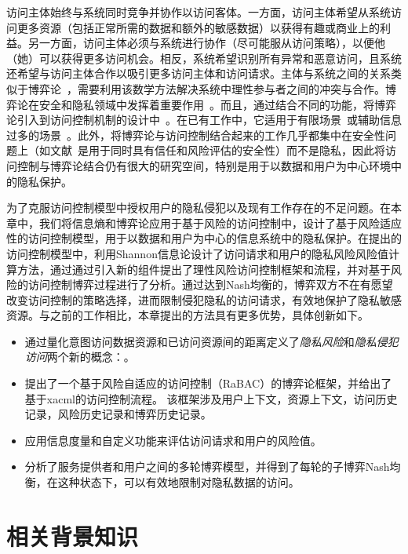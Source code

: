 访问主体始终与系统同时竞争并协作以访问客体。一方面，访问主体希望从系统访问更多资源（包括正常所需的数据和额外的敏感数据）以获得有趣或商业上的利益。另一方面，访问主体必须与系统进行协作（尽可能服从访问策略），以便他（她）可以获得更多访问机会。相反，系统希望识别所有异常和恶意访问，且系统还希望与访问主体合作以吸引更多访问主体和访问请求。主体与系统之间的关系类似于博弈论~\cite{gibbons1992game}，需要利用该数学方法解决系统中理性参与者之间的冲突与合作。博弈论在安全和隐私领域中发挥着重要作用~\cite{do2017game,zhu2018game}。而且，通过结合不同的功能，将博弈论引入到访问控制机制的设计中~\cite{hu2014game,zhang2015towards,liu2016dynamic,gao2018game, helil2017non}。在已有工作中，它适用于有限场景~\cite{hu2014game,gao2018game}或辅助信息过多的场景~\cite{zhang2015towards,liu2016dynamic,helil2017non}。此外，将博弈论与访问控制结合起来的工作几乎都集中在安全性问题上（如文献~\cite{helil2017non}是用于同时具有信任和风险评估的安全性）而不是隐私，因此将访问控制与博弈论结合仍有很大的研究空间，特别是用于以数据和用户为中心环境中的隐私保护。

为了克服访问控制模型中授权用户的隐私侵犯以及现有工作存在的不足问题。在本章中，我们将信息熵和博弈论应用于基于风险的访问控制中，设计了基于风险适应性的访问控制模型，用于以数据和用户为中心的信息系统中的隐私保护。在提出的访问控制模型中，利用Shannon信息论设计了访问请求和用户的隐私风险风险值计算方法，通过通过引入新的组件提出了理性风险访问控制框架和流程，并对基于风险的访问控制博弈过程进行了分析。通过达到Nash均衡的，博弈双方不在有愿望改变访问控制的策略选择，进而限制侵犯隐私的访问请求，有效地保护了隐私敏感资源。与之前的工作相比，本章提出的方法具有更多优势，具体创新如下。

\begin{itemize}
	
	\item 通过量化意图访问数据资源和已访问资源间的距离定义了\textit{隐私风险}和\textit{隐私侵犯访问}两个新的概念：。
	\item 提出了一个基于风险自适应的访问控制（RaBAC）的博弈论框架，并给出了基于xacml的访问控制流程。
	该框架涉及用户上下文，资源上下文，访问历史记录，风险历史记录和博弈历史记录。
	\item 应用信息度量和自定义功能来评估访问请求和用户的风险值。
	\item 分析了服务提供者和用户之间的多轮博弈模型，并得到了每轮的子博弈Nash均衡，在这种状态下，可以有效地限制对隐私数据的访问。
\end{itemize}


\section{相关背景知识}
\label{sec:preliminaries}

